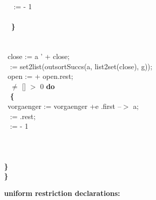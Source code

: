 {\tabbe \tabif\ \tabbe \tabif\ \tabbe {}\tabbe {} :=  - 1\\
\tabbe \tabif\ \tabbe \tabif\ \tabbe {}\\
\tabbe \tabif\ \tabbe \tabif\ {\bf \}}\\
\tabbe \tabif\ \\
\tabbe \tabif\ \tabbe  {\bf \{}\\
\tabbe \tabif\ \tabbe \tabbe close := a ' + close;\\
\tabbe \tabif\ \tabbe \tabbe {} := set2list(outsortSuccs(a, list2set(close), g));\\
\tabbe \tabif\ \tabbe \tabbe open :=  + open.rest;\\
\tabbe \tabif\ \tabbe {}  $\neq$ [] \And {} $>$ 0 {\bf do}\\
\tabbe \tabif\ \tabbe \tabbe {} {\bf \{}\\
\tabbe \tabif\ \tabbe \tabbe {}\tabbe vorgaenger := vorgaenger +e .first --$>$ a;\\
\tabbe \tabif\ \tabbe \tabbe {}\tabbe {} := .rest;\\
\tabbe \tabif\ \tabbe \tabbe {}\tabbe {} :=  - 1\\
\tabbe \tabif\ \tabbe \tabbe {}\\
\tabbe \tabif\ \tabbe {\bf \}}\\
\tabbe \tabif\ \\
{\bf \}}\\
{\bf \}}
}



\bigskip

{\bf uniform restriction declarations:}

